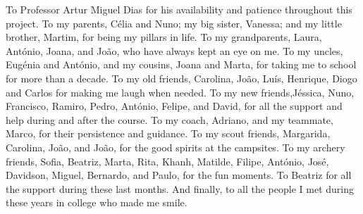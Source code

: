 
%

\begin{ntacknowledgements}

To Professor Artur Miguel Dias for his availability and patience throughout this project. 
To my parents, Célia and Nuno; my big sister, Vanessa; and my little brother, Martim, for being my pillars in life.
To my grandparents, Laura, António, Joana, and João, who have always kept an eye on me.
To my uncles, Eugénia and António, and my cousins, Joana and Marta, for taking me to school for more than a decade.
To my old friends, Carolina, João, Luís, Henrique, Diogo and Carlos for making me laugh when needed.
To my new friends,Jéssica, Nuno, Francisco, Ramiro, Pedro, António, Felipe, and David, for all the support and help during and after the course.
To my coach, Adriano, and my teammate, Marco, for their persistence and guidance.
To my scout friends, Margarida, Carolina, João, and João, for the good spirits at the campsites.
To my archery friends, Sofia, Beatriz, Marta, Rita, Khanh, Matilde, Filipe, António, José, Davidson, Miguel, Bernardo, and Paulo, for the fun moments.
To Beatriz for all the support during these last months.
And finally, to all the people I met during these years in college who made me smile.

\end{ntacknowledgements} 